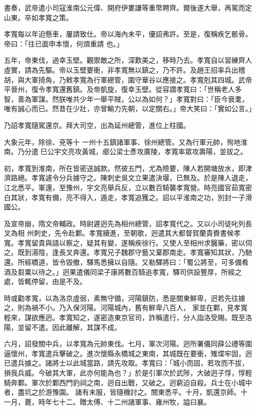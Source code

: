 \begin{pinyinscope}
 書奏，武帝遣小司寇淮南公元偉、開府伊婁謙等重幣聘齊。爾後遂大舉，再駕而定山東。卒如孝寬之策。



 孝寬每以年迫懸車，屢請致仕。帝以海內未平，優詔弗許。至是，復稱疾乞骸骨。帝曰：「往已面申本懷，何煩重請
 也。」



 五年，帝東伐，過幸玉壁。觀禦敵之所，深歎美之，移時乃去。孝寬自以習練齊人虛實，請為先驅。帝以玉壁要衝，非孝寬無以鎮之，乃不許。及趙王招率兵出稽胡，與大軍掎角，乃敕孝寬為行軍總管，圍守華谷以應接之。孝寬剋其四城。武帝平晉州，復令孝寬還舊鎮。及帝凱旋，復幸玉壁。從容謂孝寬曰：「世稱老人多智，善為軍謀。然朕唯共少年一舉平賊，公以為如何？」孝寬對曰：「臣今衰耄，唯有誠心而已。然昔在少壯，亦曾輸力先朝，以定關右。」帝大笑曰：「實如公言。」



 乃詔孝寬隨駕還京。拜大司空，出為延州總管，進位上柱國。



 大象元年，除徐、兗等十
 一州十五鎮諸軍事、徐州總管。又為行軍元帥，徇地淮南。乃分遣巳公宇文亮攻黃城，郕公梁士彥攻廣陵，孝寬率眾攻壽陽，並拔之。



 初，孝寬到淮南，所在皆密送誠款。然彼五門，尤為險要，陳人若開塘放水，即津濟路絕。孝寬遽令分兵據守之。陳刺史吳文立果遣決堰，已無及。於是陳人退走，江北悉平。軍還，至豫州，宇文亮舉兵反，立以數百騎襲孝寬營。時亮國官茹寬密白其狀，孝寬有備，亮不得入，遁走，孝寬追獲之。詔以平淮南之功，別封一子滑國公。



 及宣帝崩，隋文帝輔政。時尉遲迥先為相州總管，詔孝寬代之。又以小司徒叱列長叉為相
 州刺史，先令赴鄴。孝寬續進，至朝歌，迥遣其大都督賀蘭貴賚書候孝寬。孝寬留貴與語以察之，疑其有變，遂稱疾徐行。又使人至相州求醫藥，密以伺之。既到湯陰，逢長叉奔還。孝寬兄子魏郡守藝又棄郡南走。孝寬審知其狀，乃馳還。所經橋道，皆令毀撤，驛馬悉擁以自隨。又勒驛將曰：「蜀公將至，可多備肴酒及芻粟以待之。」迥果遣儀同梁子康將數百騎追孝寬，驛司供設豐厚，所經之處，皆輒停留，由是不及。



 時或勸孝寬，以為洛京虛弱，素無守備，河陽鎮防，悉是關東鮮卑，迥若先往據之，則為禍不小。乃入保河陽。河陽城內，舊有鮮卑八百人，
 家並在鄴，見孝寬輕來，謀欲應迥。孝寬知之，遂密造東京官司，詐稱遣行，分人詣洛受賜。既至洛陽，並留不遣。因此離解，其謀不成。



 六月，詔發關中兵，以孝寬為元帥東伐。七月，軍次河陽。迥所署儀同薛公禮等圍逼懷州，孝寬遣兵擊破之。進次懷縣永橋城之東南，其城既在要衝，雉堞牢固，迥已遣兵據之。諸將士以此城當路，請先攻取。孝寬曰：「城小而固，若攻而不拔，損我兵威。今破其大軍，此亦何能為也？」於是引軍次於武陟，大破迥子惇，惇輕騎奔鄴。軍次於鄴西門豹祠之南，迥自出戰，又破之。迥窮迫自殺。兵士在小城中者，盡坑之於游豫園。
 諸有未服，皆隨機討之。關東悉平。十月，凱還京師。十一月，薨，時年七十二。贈太傅、十二州諸軍事、雍州牧，謚曰襄。




\end{pinyinscope}

